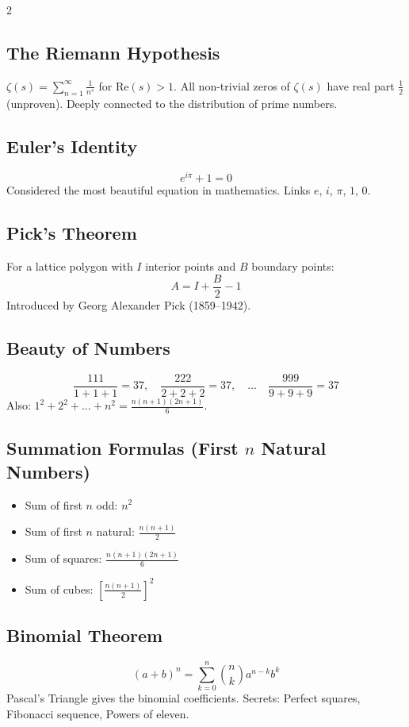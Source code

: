 \documentclass[10pt,a4paper]{article}
\begin{document}
\begin{multicols}{2}
\subsection{The Riemann Hypothesis}
$\zeta(s) = \sum_{n=1}^{\infty} \frac{1}{n^s}$ for $\text{Re}(s) > 1$. All non-trivial zeros of $\zeta(s)$ have real part $\frac{1}{2}$ (unproven). Deeply connected to the distribution of prime numbers.

\subsection{Euler's Identity}
\[
e^{i\pi} + 1 = 0
\]
Considered the most beautiful equation in mathematics. Links $e$, $i$, $\pi$, $1$, $0$.

\subsection{Pick's Theorem}
For a lattice polygon with $I$ interior points and $B$ boundary points:
\[
A = I + \frac{B}{2} - 1
\]
Introduced by Georg Alexander Pick (1859--1942).

\subsection{Beauty of Numbers}
\[
\frac{111}{1+1+1} = 37, \quad \frac{222}{2+2+2} = 37, \quad \ldots \quad \frac{999}{9+9+9} = 37
\]
Also: $1^2 + 2^2 + \ldots + n^2 = \frac{n(n+1)(2n+1)}{6}$.

\subsection{Summation Formulas (First $n$ Natural Numbers)}
\begin{itemize}
\item Sum of first $n$ odd: $n^2$
\item Sum of first $n$ natural: $\frac{n(n+1)}{2}$
\item Sum of squares: $\frac{n(n+1)(2n+1)}{6}$
\item Sum of cubes: $\left[\frac{n(n+1)}{2}\right]^2$
\end{itemize}

\subsection{Binomial Theorem}
\[
(a+b)^n = \sum_{k=0}^n \binom{n}{k} a^{n-k} b^k
\]
Pascal's Triangle gives the binomial coefficients. Secrets: Perfect squares, Fibonacci sequence, Powers of eleven.


\end{multicols}
\end{document}
